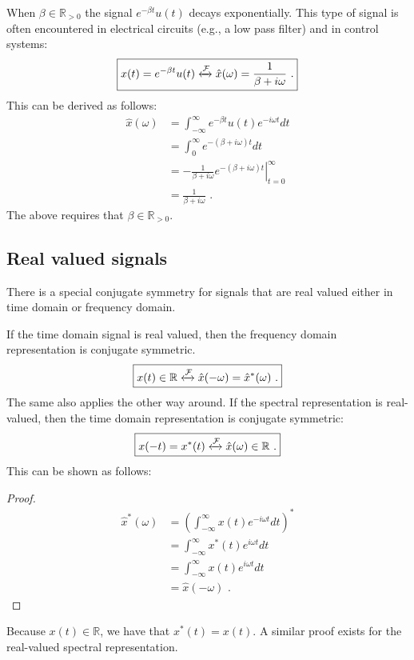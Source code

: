 When $\beta \in \mathbb{R}_{>0}$ the signal $e^{-\beta t} u(t)$ decays exponentially. This type of signal is often encountered in electrical circuits (e.g., a low pass filter) and in control systems:
\begin{equation}
\boxed{x(t)=e^{-\beta t} u(t) \xleftrightarrow{\mathcal{F}} \hat{x}(\omega)=\frac{1}{\beta + i\omega}\,\,.}
\end{equation}
This can be derived as follows:
\begin{align}
\hat{x}(\omega) &= \int_{-\infty}^{\infty} e^{-\beta t} u(t) e^{-i\omega t}dt \\
&= \int_{0}^{\infty} e^{-(\beta+i\omega) t} dt \\
&= \left. -\frac{1}{\beta + i\omega} e^{-(\beta + i\omega)t} \right|_{t=0}^{\infty}\\
&= \frac{1}{\beta + i\omega}\,\,.
\end{align}
The above requires that $\beta \in \mathbb{R}_{> 0}$.

\subsection{Real valued signals}
There is a special conjugate symmetry for signals that are real valued either in time domain or frequency domain. 

If the time domain signal is real valued, then the frequency domain representation is conjugate symmetric.
\begin{equation}
\boxed{
x(t) \in \mathbb{R} \xleftrightarrow{\mathcal{F}} \hat{x}(-\omega)=\hat{x}^*(\omega)\,\,.
}
\end{equation}
The same also applies the other way around. If the spectral representation is real-valued, then the time domain representation is conjugate symmetric:
\begin{equation}
\boxed{
x(-t)=x^*(t) \xleftrightarrow{\mathcal{F}} \hat{x}(\omega) \in \mathbb{R}\,\,.
}
\end{equation}
This can be shown as follows:
\begin{proof}
\begin{align}
\hat{x}^*(\omega) &= \left(\int_{-\infty}^{\infty} x(t) e^{-i\omega t}dt\right)^* \\
 &= \int_{-\infty}^{\infty} x^*(t) e^{i\omega t}dt \\
 &= \int_{-\infty}^{\infty} x(t) e^{i\omega t}dt \\
 &= \hat{x}(-\omega)\,\,.
\end{align}
\end{proof}
Because $x(t)\in\mathbb{R}$, we have that $x^*(t)=x(t)$. A similar proof exists for the real-valued spectral representation. 

